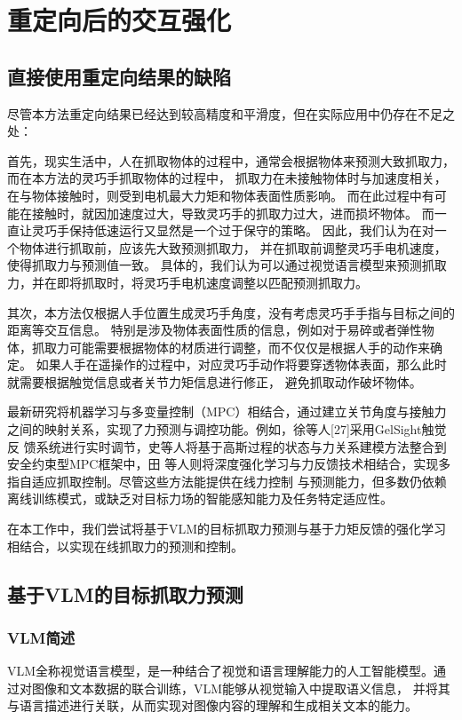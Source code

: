 \chapter{重定向后的交互强化}

\section{直接使用重定向结果的缺陷}
尽管本方法重定向结果已经达到较高精度和平滑度，但在实际应用中仍存在不足之处：

首先，现实生活中，人在抓取物体的过程中，通常会根据物体来预测大致抓取力，而在本方法的灵巧手抓取物体的过程中，
抓取力在未接触物体时与加速度相关，在与物体接触时，则受到电机最大力矩和物体表面性质影响。
而在此过程中有可能在接触时，就因加速度过大，导致灵巧手的抓取力过大，进而损坏物体。
而一直让灵巧手保持低速运行又显然是一个过于保守的策略。
因此，我们认为在对一个物体进行抓取前，应该先大致预测抓取力，
并在抓取前调整灵巧手电机速度，使得抓取力与预测值一致。
具体的，我们认为可以通过视觉语言模型来预测抓取力，并在即将抓取时，将灵巧手电机速度调整以匹配预测抓取力。

其次，本方法仅根据人手位置生成灵巧手角度，没有考虑灵巧手手指与目标之间的距离等交互信息。
特别是涉及物体表面性质的信息，例如对于易碎或者弹性物体，抓取力可能需要根据物体的材质进行调整，而不仅仅是根据人手的动作来确定。
如果人手在遥操作的过程中，对应灵巧手动作将要穿透物体表面，那么此时就需要根据触觉信息或者关节力矩信息进行修正，
避免抓取动作破坏物体。

最新研究将机器学习与多变量控制（MPC）相结合，通过建立关节角度与接触力之间的映射关系，实现了力预测与调控功能。例如，徐等人[27]采用GelSight触觉反
馈系统进行实时调节，史等人\cite{vulinImprovedLearningRobot2021}将基于高斯过程的状态与力关系建模方法整合到安全约束型MPC框架中，田
等人\cite{huPhysicalInteractionReconstructing2022}则将深度强化学习与力反馈技术相结合，实现多指自适应抓取控制。尽管这些方法能提供在线力控制
与预测能力，但多数仍依赖离线训练模式，或缺乏对目标力场的智能感知能力及任务特定适应性。

在本工作中，我们尝试将基于VLM的目标抓取力预测与基于力矩反馈的强化学习相结合，以实现在线抓取力的预测和控制。

\section{基于VLM的目标抓取力预测}
\subsection{VLM简述}
VLM全称视觉语言模型，是一种结合了视觉和语言理解能力的人工智能模型。通过对图像和文本数据的联合训练，VLM能够从视觉输入中提取语义信息，
并将其与语言描述进行关联，从而实现对图像内容的理解和生成相关文本的能力。

